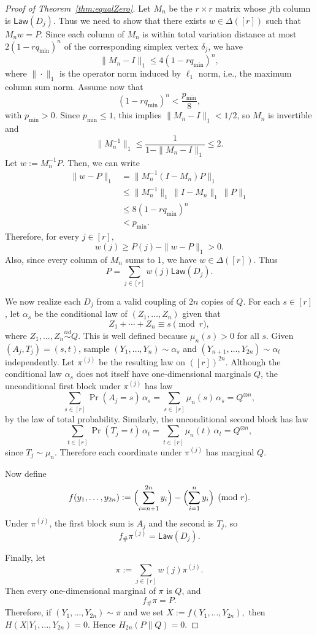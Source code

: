 \documentclass[journal]{IEEEtran}
\newcommand{\1}{\mathbf{1}}
\begin{document}
\begin{proof}[Proof of Theorem~\ref{thm:equalZero}]
Let $M_n$ be the $r\times r$ matrix whose $j$th column is $\mathsf{Law}(D_j)$.
Thus we need to show that there exists $w\in \Delta([r])$ such that $M_n w = P$.
Since each column of $M_n$ is within total variation distance at most $2(1-rq_{\min})^n$ of the corresponding simplex vertex $\delta_j$, we have
\[
\|M_n-I\|_1 \le 4(1-rq_{\min})^n,
\]
where $\|\cdot\|_1$ is the operator norm induced by $\ell_1$ norm, i.e., the maximum column sum norm. Assume now that
\[
(1-rq_{\min})^n<\frac{p_{\min}}{8},
\]
with $p_{\min}>0$. Since $p_{\min}\le 1$, this implies $\|M_n-I\|_1<1/2$, so $M_n$ is invertible and
\[
\|M_n^{-1}\|_1\le \frac{1}{1-\|M_n-I\|_1}\le 2.
\]
Let \(w:=M_n^{-1}P.\) Then, we can write 
\begin{align*}
\|w-P\|_1 & = \|M_n^{-1}(I-M_n)P\|_1\\
& \le \|M_n^{-1}\|_1\,\|I-M_n\|_1\,\|P\|_1\\
& \le 8(1-rq_{\min})^n\\
& < p_{\min}.
\end{align*}
Therefore, for every $j\in[r]$,
\[
w(j)\ge P(j)-\|w-P\|_1 >0.
\]
Also, since every column of $M_n$ sums to $1$, we have \(w\in\Delta([r])\).
Thus
\[
P=\sum_{j\in[r]} w(j)\mathsf{Law}(D_j).
\]

We now realize each $D_j$ from a valid coupling of $2n$ copies of $Q$.
For each $s\in[r]$, let $\alpha_s$ be the conditional law of $(Z_1,\dots,Z_n)$ given that
\[
Z_1+\cdots+Z_n\equiv s \pmod r,
\]
where $Z_1,\dots,Z_n\stackrel{iid}{\sim} Q$.
This is well defined because $\mu_n(s)>0$ for all $s$.
Given $(A_j,T_j)=(s,t)$, sample $(Y_1,\dots,Y_n)\sim \alpha_s$ and $(Y_{n+1},\dots,Y_{2n})\sim \alpha_t$ independently.
Let $\pi^{(j)}$ be the resulting law on $([r])^{2n}$.
Although the conditional law \(\alpha_s\) does not itself have one-dimensional marginals \(Q\), the unconditional first block under \(\pi^{(j)}\) has law
\[
\sum_{s\in[r]} \Pr(A_j=s)\,\alpha_s
=
\sum_{s\in[r]} \mu_n(s)\,\alpha_s
=
Q^{\otimes n},
\]
by the law of total probability. Similarly, the unconditional second block has law
\[
\sum_{t\in[r]} \Pr(T_j=t)\,\alpha_t
=
\sum_{t\in[r]} \mu_n(t)\,\alpha_t
=
Q^{\otimes n},
\]
since \(T_j\sim \mu_n\). Therefore each coordinate under $\pi^{(j)}$ has marginal $Q$. 

Now define
\[
f(y_1,\dots,y_{2n})
:=
\Bigl(\sum_{i=n+1}^{2n} y_i\Bigr)-\Bigl(\sum_{i=1}^n y_i\Bigr)
\pmod r.
\]
Under $\pi^{(j)}$, the first block sum is $A_j$ and the second is $T_j$, so
\[
f_\#\pi^{(j)}=\mathsf{Law}(D_j).
\]

Finally, let
\[
\pi:=\sum_{j\in[r]} w(j)\pi^{(j)}.
\]
Then every one-dimensional marginal of $\pi$ is $Q$, and
\[
f_\#\pi=P.
\]
Therefore, if $(Y_1,\dots,Y_{2n})\sim \pi$ and we set \(X:=f(Y_1,\dots,Y_{2n}),\)
then $H(X| Y_1,\dots,Y_{2n})=0$.
Hence \(H_{2n}(P\|Q)=0.\)


\end{proof}
\end{document}
